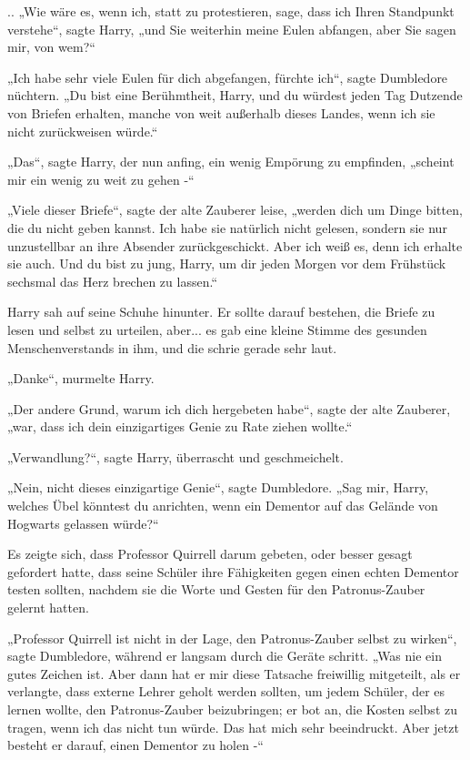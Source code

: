 {.. „Wie wäre es, wenn ich, statt zu protestieren, sage, dass ich Ihren Standpunkt verstehe“, sagte Harry, „und Sie weiterhin meine Eulen abfangen, aber Sie sagen mir, von wem?“

„Ich habe sehr viele Eulen für dich abgefangen, fürchte ich“, sagte Dumbledore nüchtern. „Du bist eine Berühmtheit, Harry, und du würdest jeden Tag Dutzende von Briefen erhalten, manche von weit außerhalb dieses Landes, wenn ich sie nicht zurückweisen würde.“

„Das“, sagte Harry, der nun anfing, ein wenig Empörung zu empfinden, „scheint mir ein wenig zu weit zu gehen -“

„Viele dieser Briefe“, sagte der alte Zauberer leise, „werden dich um Dinge bitten, die du nicht geben kannst. Ich habe sie natürlich nicht gelesen, sondern sie nur unzustellbar an ihre Absender zurückgeschickt. Aber ich weiß es, denn ich erhalte sie auch. Und du bist zu jung, Harry, um dir jeden Morgen vor dem Frühstück sechsmal das Herz brechen zu lassen.“

Harry sah auf seine Schuhe hinunter. Er sollte darauf bestehen, die Briefe zu lesen und selbst zu urteilen, aber... es gab eine kleine Stimme des gesunden Menschenverstands in ihm, und die schrie gerade sehr laut.

„Danke“, murmelte Harry.

„Der andere Grund, warum ich dich hergebeten habe“, sagte der alte Zauberer, „war, dass ich dein einzigartiges Genie zu Rate ziehen wollte.“

„Verwandlung?“, sagte Harry, überrascht und geschmeichelt.

„Nein, nicht dieses einzigartige Genie“, sagte Dumbledore. „Sag mir, Harry, welches Übel könntest du anrichten, wenn ein Dementor auf das Gelände von Hogwarts gelassen würde?“

Es zeigte sich, dass Professor Quirrell darum gebeten, oder besser gesagt gefordert hatte, dass seine Schüler ihre Fähigkeiten gegen einen echten Dementor testen sollten, nachdem sie die Worte und Gesten für den Patronus-Zauber gelernt hatten.

„Professor Quirrell ist nicht in der Lage, den Patronus-Zauber selbst zu wirken“, sagte Dumbledore, während er langsam durch die Geräte schritt. „Was nie ein gutes Zeichen ist. Aber dann hat er mir diese Tatsache freiwillig mitgeteilt, als er verlangte, dass externe Lehrer geholt werden sollten, um jedem Schüler, der es lernen wollte, den Patronus-Zauber beizubringen; er bot an, die Kosten selbst zu tragen, wenn ich das nicht tun würde. Das hat mich sehr beeindruckt. Aber jetzt besteht er darauf, einen Dementor zu holen -“

}
